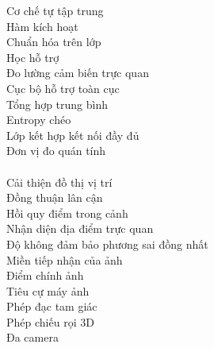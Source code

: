 \begin{keyword}
                  {Cơ chế tự tập trung}           \\
             {Hàm kích hoạt}                 \\
             {Chuẩn hóa trên lớp}            \\
              {Học hỗ trợ}                    \\
                 {Đo lường cảm biến trực quan}   \\
            {Cục bộ hỗ trợ toàn cục}        \\
                 {Tổng hợp trung bình}           \\
                   {Entropy chéo}                  \\
    {Lớp kết hợp kết nối đầy đủ}    \\
       {Đơn vị đo quán tính}           \\
    \\
         {Cải thiện đồ thị vị trí}       \\
          {Đồng thuận lân cận}	 		\\
          {Hồi quy điểm trong cảnh} 		\\
        {Nhận diện địa điểm trực quan} 	\\
       {Độ không đảm bảo phương sai đồng nhất} \\
                 {Miền tiếp nhận của ảnh}		\\
                 {Điểm chính ảnh}                \\
                    {Tiêu cự máy ảnh}               \\
                   {Phép đạc tam giác}             \\
                {Phép chiếu rọi 3D}             \\
                   {Đa camera}                     \\
\end{keyword}

